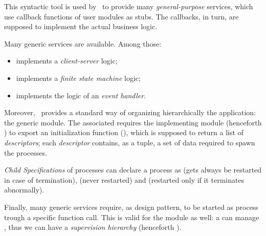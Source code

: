 This syntactic tool is used by \OTP\ to provide many
\emph{general-purpose} services, which use callback functions of user
modules as stubs. The callbacks, in turn, are supposed to implement the
actual business logic.

Many generic services are available. Among those:
\begin{itemize}
\item   {} implements a \emph{client-server} logic;
\item   {} implements a \emph{finite state machine} logic;
\item   {} implements the logic of an
        \emph{event handler}.
\end{itemize}

Moreover, \OTP\ provides a standard way of organizing hierarchically the
application: the generic  module. The associated
 requires the implementing module (henceforth
) to export an initialization function
(), which is supposed to return a list of
\emph{descriptors}; each \emph{descriptor} contains, as a tuple, a set of
data required to spawn the  processes.

\emph{Child Specifications} of  processes can
declare a process as  (gets always be restarted in
case of termination),  (never restarted) and
 (restarted only if it terminates abnormally).

Finally, many generic services require, as design pattern, to be started
as process trough a specific function call. This is valid for the
 module as well: a  can manage
, thus we can have a \emph{supervision hierarchy}
(henceforth ).

